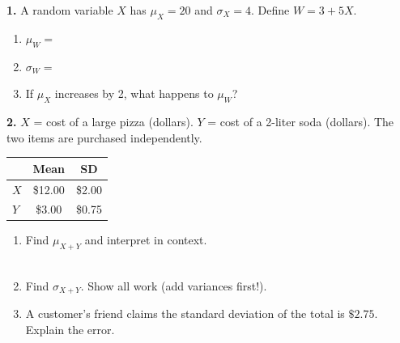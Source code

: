 \documentclass[10pt]{article}
\begin{document}
\namedateperiod

\vspace{0.1in}

\begin{practicebox}
\small

\textbf{1.} A random variable $X$ has $\mu_X = 20$ and $\sigma_X = 4$.
Define $W = 3 + 5X$.

\begin{enumerate}[label=(\alph*), leftmargin=2em, itemsep=8pt]
  \item $\mu_W = $ \blank{4cm}
  \item $\sigma_W = $ \blank{4cm}
  \item If $\mu_X$ increases by 2, what happens to $\mu_W$? \blank{5cm}
\end{enumerate}

\vspace{0.14in}

\textbf{2.} $X$ = cost of a large pizza (dollars). $Y$ = cost of a 2-liter soda (dollars).
The two items are purchased independently.
\begin{center}
\renewcommand{\arraystretch}{1.3}
\begin{tabular}{@{}lcc@{}}
& \textbf{Mean} & \textbf{SD} \\
\hline
$X$ & \$12.00 & \$2.00 \\
$Y$ & \$3.00  & \$0.75 \\
\end{tabular}
\end{center}

\begin{enumerate}[label=(\alph*), leftmargin=2em, itemsep=8pt]
  \item Find $\mu_{X+Y}$ and interpret in context.\\
        \writeline\\[1pt]\writeline

  \item Find $\sigma_{X+Y}$. Show all work (add variances first!).

        \vspace{0.3in}

  \item A customer's friend claims the standard deviation of the total is $\$2.75$.
        Explain the error.\\
        \writeline
\end{enumerate}

\vspace{0.14in}


\end{practicebox}
\end{document}
